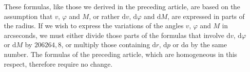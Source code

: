 These formulas, like those we derived in the preceding article, are based on the assumption that $v$, $\varphi$ and $M$, or rather $\mathrm{d}v$, $\mathrm{d}\varphi$ and $\mathrm{d}M$, are expressed in parts of the radius. If we wish to express the variations of the angles $v$, $\varphi$ and $M$ in arcseconds, we must either divide those parts of the formulas that involve $\mathrm{d}v$, $\mathrm{d}\varphi$ or $\mathrm{d}M$ by $206264{,}8$, or multiply those containing $\mathrm{d}r$, $\mathrm{d}p$ or $\mathrm{d}a$ by the same number. The formulas of the preceding article, which are homogeneous in this respect, therefore require no change.
